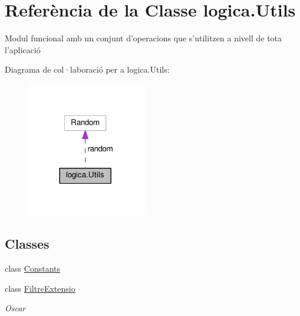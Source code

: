 \hypertarget{classlogica_1_1_utils}{\section{Referència de la Classe logica.\+Utils}
\label{classlogica_1_1_utils}
}


Modul funcional amb un conjunt d'operacions que s'utilitzen a nivell de tota l'aplicació  




Diagrama de col·laboració per a logica.\+Utils\+:
\nopagebreak
\begin{figure}[H]
\begin{center}
\leavevmode
\includegraphics[width=149pt]{classlogica_1_1_utils__coll__graph}
\end{center}
\end{figure}
\subsection*{Classes}
\begin{DoxyCompactItemize}
\item 
class \hyperlink{classlogica_1_1_utils_1_1_constants}{Constants}
\item 
class \hyperlink{classlogica_1_1_utils_1_1_filtre_extensio}{Filtre\+Extensio}
\begin{DoxyCompactList}\small\item\em Oscar \end{DoxyCompactList}\end{DoxyCompactItemize}
